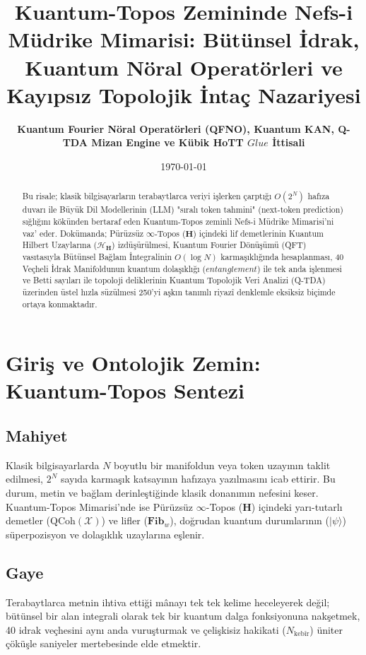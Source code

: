 \documentclass[11pt, a4paper]{article}
\title{\textbf{Kuantum-Topos Zemininde Nefs-i Müdrike Mimarisi: Bütünsel İdrak, Kuantum Nöral Operatörleri ve Kayıpsız Topolojik İntaç Nazariyesi}}
\author{\textbf{Kuantum Fourier Nöral Operatörleri (QFNO), Kuantum KAN, Q-TDA Mizan Engine ve Kübik HoTT $Glue$ İttisali}}
\date{\today}
\begin{document}
\maketitle

\begin{abstract}
Bu risale; klasik bilgisayarların terabaytlarca veriyi işlerken çarptığı $O(2^N)$ hafıza duvarı ile Büyük Dil Modellerinin (LLM) "sıralı token tahmini" (next-token prediction) sığlığını kökünden bertaraf eden Kuantum-Topos zeminli Nefs-i Müdrike Mimarisi'ni vaz' eder. Dokümanda; Pürüzsüz $\infty$-Topos ($\mathbf{H}$) içindeki lif demetlerinin Kuantum Hilbert Uzaylarına ($\mathcal{H}_{\mathbf{H}}$) izdüşürülmesi, Kuantum Fourier Dönüşümü (QFT) vasıtasıyla Bütünsel Bağlam İntegralinin $O(\log N)$ karmaşıklığında hesaplanması, 40 Veçheli İdrak Manifoldunun kuantum dolaşıklığı ($entanglement$) ile tek anda işlenmesi ve Betti sayıları ile topoloji deliklerinin Kuantum Topolojik Veri Analizi (Q-TDA) üzerinden üstel hızla süzülmesi 250'yi aşkın tanımlı riyazî denklemle eksiksiz biçimde ortaya konmaktadır.
\end{abstract}

\tableofcontents
\newpage

\section{Giriş ve Ontolojik Zemin: Kuantum-Topos Sentezi}

\subsection{Mahiyet}
Klasik bilgisayarlarda $N$ boyutlu bir manifoldun veya token uzayının taklit edilmesi, $2^N$ sayıda karmaşık katsayının hafızaya yazılmasını icab ettirir. Bu durum, metin ve bağlam derinleştiğinde klasik donanımın nefesini keser. Kuantum-Topos Mimarisi'nde ise Pürüzsüz $\infty$-Topos ($\mathbf{H}$) içindeki yarı-tutarlı demetler ($\text{QCoh}(\mathcal{X})$) ve lifler ($\mathbf{Fib}_w$), doğrudan kuantum durumlarının ($|\psi\rangle$) süperpozisyon ve dolaşıklık uzaylarına eşlenir.

\subsection{Gaye}
Terabaytlarca metnin ihtiva ettiği mânayı tek tek kelime heceleyerek değil; bütünsel bir alan integrali olarak tek bir kuantum dalga fonksiyonuna nakşetmek, 40 idrak veçhesini aynı anda vuruşturmak ve çelişkisiz hakikati ($N_{\text{kebîr}}$) üniter çöküşle saniyeler mertebesinde elde etmektir.
\end{document}
